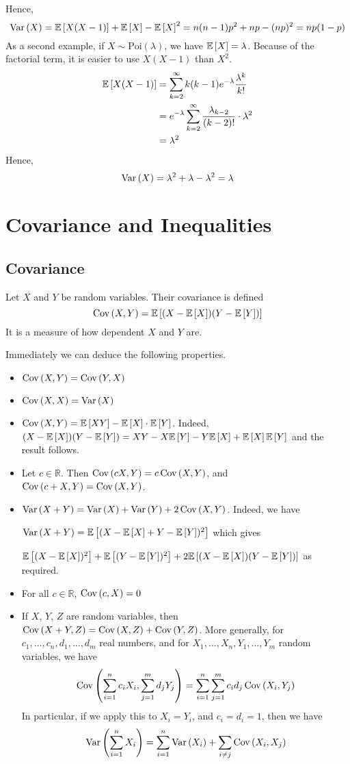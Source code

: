 \documentclass{article}
\begin{document}
Hence,
\[ \Var{X} = \expect{X(X-1)} + \expect{X} - \expect{X}^2 = n(n-1)p^2 + np - (np)^2 = np(1-p) \]
As a second example, if $X \sim \text{Poi}(\lambda)$, we have $\expect{X} = \lambda$. Because of the factorial term, it is easier to use $X(X-1)$ than $X^2$.
\begin{align*}
    \expect{X(X-1)} & = \sum_{k=2}^\infty k(k-1) e^{-\lambda} \frac{\lambda^k}{k!}                  \\
                    & = e^{-\lambda} \sum_{k=2}^\infty \frac{\lambda_{k-2}}{(k-2)!} \cdot \lambda^2 \\
                    & = \lambda^2
\end{align*}
Hence,
\[ \Var{X} = \lambda^2 + \lambda - \lambda^2 = \lambda \]

\section{Covariance and Inequalities}
\subsection{Covariance}
\begin{definition}
    Let $X$ and $Y$ be random variables. Their covariance is defined
    \[ \Cov{X,Y} = \expect{(X - \expect{X})(Y - \expect{Y})} \]
    It is a measure of how dependent $X$ and $Y$ are.
\end{definition}
\noindent Immediately we can deduce the following properties.
\begin{itemize}
    \item $\Cov{X,Y} = \Cov{Y,X}$
    \item $\Cov{X,X} = \Var{X}$
    \item $\Cov{X,Y} = \expect{XY} - \expect{X}\cdot\expect{Y}$. Indeed, $(X - \expect{X})(Y - \expect{Y}) = XY - X\expect{Y} - Y\expect{X} + \expect{X}\expect{Y}$ and the result follows.
    \item Let $c \in \mathbb R$. Then $\Cov{cX,Y} = c\Cov{X,Y}$, and $\Cov{c + X,Y} = \Cov{X,Y}$.
    \item $\Var{X + Y} = \Var{X} + \Var{Y} + 2\Cov{X,Y}$. Indeed, we have

          $\Var{X + Y} = \expect{(X - \expect{X} + Y - \expect{Y})^2}$ which gives

          $\expect{(X - \expect{X})^2} + \expect{(Y - \expect{Y})^2} + 2\expect{(X - \expect{X})(Y - \expect{Y})}$ as required.
    \item For all $c \in \mathbb R$, $\Cov{c, X} = 0$
    \item If $X$, $Y$, $Z$ are random variables, then $\Cov{X + Y,Z} = \Cov{X,Z} + \Cov{Y,Z}$. More generally, for $c_1, \dots, c_n, d_1, \dots, d_m$ real numbers, and for $X_1, \dots, X_n, Y_1, \dots, Y_m$ random variables, we have
          \[ \Cov{\sum_{i=1}^n c_i X_i,\sum_{j=1}^m d_j Y_j} = \sum_{i=1}^n \sum_{j=1}^m c_i d_j \Cov{X_i,Y_j} \]
          In particular, if we apply this to $X_i = Y_i$, and $c_i = d_i = 1$, then we have
          \[ \Var{\sum_{i=1}^n X_i} = \sum_{i=1}^n \Var{X_i} + \sum_{i \neq j} \Cov{X_i,X_j} \]
\end{itemize}
\end{document}
